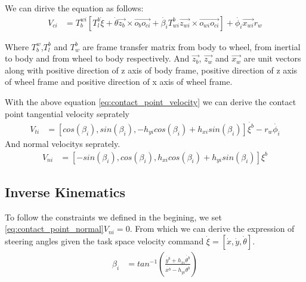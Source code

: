We can dirive the equation as follows:
\begin{equation}\label{eq:contact_point_velocity}
	\begin{split}
	V_{ci} &= T_b^{wi} [T_l^b\dot{\xi} + \dot{\theta}\overrightarrow{z_b}\times\overrightarrow{o_bo_{ci}} + \dot{\beta_i}T_{wi}^b\overrightarrow{z_{wi}}\times\overrightarrow{o_{wi}o_{ci}}] + \dot{\phi_i}\overrightarrow{x_{wi}}r_w
	\end{split}
\end{equation}

Where $T_b^w$,$T_l^b$ and $T_w^b$ are frame transfer matrix from body to wheel, from inertial to body and from wheel to body respectively. And $\overrightarrow{z_b}$, $\overrightarrow{z_w}$ and 
$\overrightarrow{x_w}$ are unit vectors along with positive direction of z axis of body frame, positive direction of z axis of wheel frame and positive direction of x axis of wheel frame.

With the above equation \cref{eq:contact_point_velocity} we can derive the contact point tangential velocity seprately
\begin{equation}\label{eq:contact_point_tangential}
	\begin{split}
	V_{ti} &= [cos(\beta_i), sin(\beta_i), -h_{yi}cos(\beta_i)+h_{xi}sin(\beta_i)]\dot{\xi^b} - r_w\dot{\phi_i}
	\end{split}
\end{equation}
And normal velocitys seprately.
\begin{equation}\label{eq:contact_point_normal}
	\begin{split}
	V_{ni} &= [-sin(\beta_i), cos(\beta_i), h_{xi}cos(\beta_i)+h_{yi}sin(\beta_i)]\xi^b
	\end{split}
\end{equation}

\subsection{Inverse Kinematics}
\label{sec:inverseKinematics}

To follow the constraints we defined in the begining, we set \cref{eq:contact_point_normal}$V_{ni}=0$. From which we can derive the expression of steering angles given the task space velocity command 
$\dot{\xi}=[\dot{x},\dot{y},\dot{\theta}]$.
\begin{equation}\label{eq:beta}
	\begin{split}
	\beta_i &= tan^{-1}(\frac{\dot{y^b}+h_{xi}\dot{\theta^b}}{\dot{x^b}-h_{yi}\dot{\theta^b}})
	\end{split}
\end{equation}

